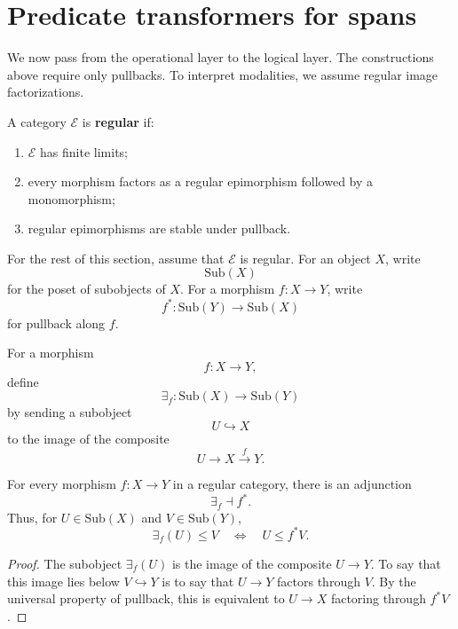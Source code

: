 \section{Predicate transformers for spans}
\label{sec:relative-predicate-transformers-spans}

We now pass from the operational layer to the logical layer. The constructions
above require only pullbacks. To interpret modalities, we assume regular image
factorizations.

\begin{definition}
\label{def:regular-category-relative}
A category \(\mathcal E\) is \textbf{regular} if:
\begin{enumerate}
\item \(\mathcal E\) has finite limits;
\item every morphism factors as a regular epimorphism followed by a monomorphism;
\item regular epimorphisms are stable under pullback.
\end{enumerate}
\end{definition}

For the rest of this section, assume that \(\mathcal E\) is regular. For an
object \(X\), write
\[
\mathrm{Sub}(X)
\]
for the poset of subobjects of \(X\). For a morphism \(f:X\to Y\), write
\[
f^\ast:\mathrm{Sub}(Y)\to\mathrm{Sub}(X)
\]
for pullback along \(f\).

\begin{definition}
\label{def:existential-image-relative}
For a morphism
\[
f:X\to Y,
\]
define
\[
\exists_f:\mathrm{Sub}(X)\to\mathrm{Sub}(Y)
\]
by sending a subobject
\[
U\hookrightarrow X
\]
to the image of the composite
\[
U\to X\xrightarrow{f}Y.
\]
\end{definition}

\begin{proposition}
\label{prop:existential-left-adjoint-relative}
For every morphism \(f:X\to Y\) in a regular category, there is an adjunction
\[
\exists_f\dashv f^\ast.
\]
Thus, for \(U\in\mathrm{Sub}(X)\) and \(V\in\mathrm{Sub}(Y)\),
\[
\exists_f(U)\le V
\quad\Longleftrightarrow\quad
U\le f^\ast V.
\]
\end{proposition}

\begin{proof}
The subobject \(\exists_f(U)\) is the image of the composite \(U\to Y\). To
say that this image lies below \(V\hookrightarrow Y\) is to say that
\(U\to Y\) factors through \(V\). By the universal property of pullback, this
is equivalent to \(U\to X\) factoring through \(f^\ast V\).
\end{proof}

